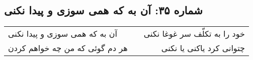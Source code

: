 \begin{center}
\section*{شماره ۳۵: آن به که همی سوزی و پیدا نکنی}
\label{sec:035}
\begin{longtable}{l p{0.5cm} r}
آن به که همی سوزی و پیدا نکنی
&&
خود را به تکلّف سر غوغا نکنی
\\
هر دم گوئی که من چه خواهم کردن
&&
چتوانی کرد یاکنی یا نکنی
\\
\end{longtable}
\end{center}
